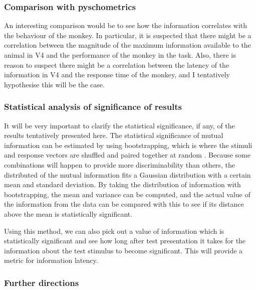 \subsubsection{Comparison with pyschometrics}

An interesting comparison would be to see how the information correlates with the behaviour of the monkey.
In particular, it is suspected that there might be a correlation between the magnitude of the maximum information available to the animal in V4 and the performance of the monkey in the task.
Also, there is reason to suspect there might be a correlation between the latency of the information in V4 and the response time of the monkey, and I tentatively hypothesise this will be the case.

\subsubsection{Statistical analysis of significance of results}

It will be very important to clarify the statistical significance, if any, of the results tentatively presented here.
The statistical significance of mutual information can be estimated by using bootstrapping, which is where the stimuli and response vectors are shuffled and paired together at random \cite{Ince2011}. Because some combinations will happen to provide more discriminability than others, the distributed of the mutual information fits a Gaussian distribution with a certain mean and standard deviation. By taking the distribution of information with bootstrapping, the mean and variance can be computed, and the actual value of the information from the data can be compared with this to see if its distance above the mean is statistically significant.

Using this method, we can also pick out a value of information which is statistically significant and see how long after test presentation it takes for the information about the test stimulus to become significant. This will provide a metric for information latency.

\subsubsection{Further directions}

